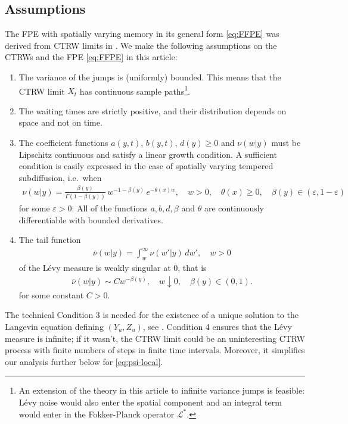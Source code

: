 \documentclass[a4paper,12pt]{elsarticle}
\numberwithin{equation}{section}
\theoremstyle{plain}
\theoremstyle{definition}
\theoremstyle{remark}
\numberwithin{equation}{section}
\newcommand{\1}{\mathbf 1}
\begin{document}
\subsection{Assumptions}

The FPE with spatially varying memory in its general form \eqref{eq:FFPE} was derived from CTRW limits in \cite{BaeumerStraka16}.  We make the following assumptions on the CTRWs and the FPE \eqref{eq:FFPE} in this article:
\begin{enumerate}
\item
The variance of the jumps is (uniformly) bounded.  This means that the CTRW limit $X_t$ has continuous sample paths\footnote{An extension of the theory in this article to infinite variance jumps is feasible: L\'evy noise would also enter the spatial component and an integral term would enter in the Fokker-Planck operator $\mathcal L^*$.}.
\item
The waiting times are strictly positive, and their distribution depends on space and not on time.
\item
The coefficient functions $a(y,t)$, $b(y,t)$, $d(y) \ge 0$ and $\nu(w|y)$ must be Lipschitz continuous and satisfy a linear growth condition.
A sufficient condition is easily expressed in the case of spatially varying tempered subdiffusion, i.e.\ when
\begin{align}
\nu(w|y) = \frac{\beta(y)}{\Gamma(1-\beta(y))}\, w^{-1-\beta(y)}\,
e^{-\theta(x) w}, \quad w > 0, \quad \theta(x) \ge 0, \quad \beta(y) \in (\varepsilon,1-\varepsilon)
\end{align}
for some $\varepsilon > 0$: All of the functions $a, b, d, \beta$ and $\theta$ are continuously differentiable with bounded derivatives.
\item
The tail function
\begin{align}
\overline \nu(w | y) = \int_w^\infty \nu(w'|y)\,dw', \quad w > 0
\end{align}
of the L\'evy measure is weakly singular at $0$, that is
\begin{align} \label{eq:ass4}
\overline \nu(w|y) \sim C w^{-\beta(y)}, \quad w \downarrow 0,
\quad \beta(y) \in (0,1).
\end{align}
for some constant $C > 0$.
\end{enumerate}
The technical Condition 3 is needed for the existence of a unique solution to the Langevin equation defining $(Y_u, Z_u)$, see \cite{Straka17}.
Condition 4 ensures that the L\'evy measure is infinite; if it wasn't, the CTRW limit could be an uninteresting CTRW process with finite numbers of steps in finite time intervals.  Moreover, it simplifies our analysis further below for \eqref{eq:psi-local}.
\end{document}
